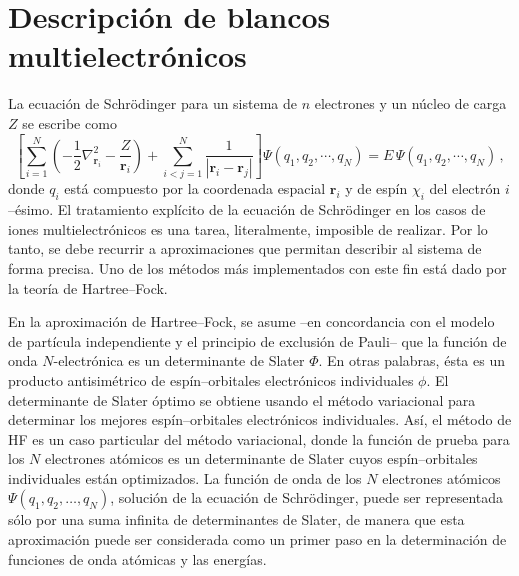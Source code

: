 \begin{comment}
\end{comment}

\section{Descripción de blancos multielectrónicos}
\label{sec:atomos}

La ecuación de Schrödinger para un sistema de $n$ electrones y 
un núcleo de carga $Z$ se escribe como
\begin{equation}
\left[
\sum_{i=1}^N \left(-\frac{1}{2}\nabla^2_{{\mathbf r}_i}
                   -\frac{Z}{{\mathbf r}_i}\right) + 
\sum_{i<j=1}^N \frac{1}{|{\mathbf r}_i - {\mathbf r}_j |} 
\right] \Psi\left(q_1,q_2,\cdots,q_N\right) 
= E\, \Psi\left(q_1,q_2,\cdots,q_N\right) 
\, ,
\end{equation}
donde $q_i$ está compuesto por la coordenada espacial $\mathbf{r}_i$ y 
de espín $\chi_i$ del electrón $i$--ésimo. El tratamiento explícito de 
la ecuación de Schr\"odinger en los casos de iones multielectrónicos es 
una tarea, literalmente, imposible de realizar. Por lo tanto, se debe 
recurrir a aproximaciones que permitan describir al sistema de forma 
precisa. Uno de los métodos más implementados con este fin está dado por 
la teoría de Hartree--Fock. 

En la aproximación de Hartree--Fock, se asume --en concordancia con el 
modelo de partícula independiente y el principio de exclusión de Pauli-- 
que la función de onda $N$-electrónica es un determinante de Slater 
$\Phi$. En otras palabras, ésta es un producto antisimétrico de 
espín--orbitales electrónicos individuales $\phi$. El determinante de 
Slater óptimo se obtiene usando el método variacional para determinar 
los mejores espín--orbitales electrónicos individuales. Así, el método 
de HF es un caso particular del método variacional, donde la función de 
prueba para los $N$ electrones atómicos es un determinante de Slater 
cuyos espín--orbitales individuales están optimizados. La función de 
onda de los $N$ electrones atómicos $\Psi(q_1,q_2,\dots,q_N)$, solución 
de la ecuación de Schrödinger, puede ser representada sólo por una suma 
infinita de determinantes de Slater, de manera que esta aproximación 
puede ser considerada como un primer paso en la determinación de 
funciones de onda atómicas y las energías. 

